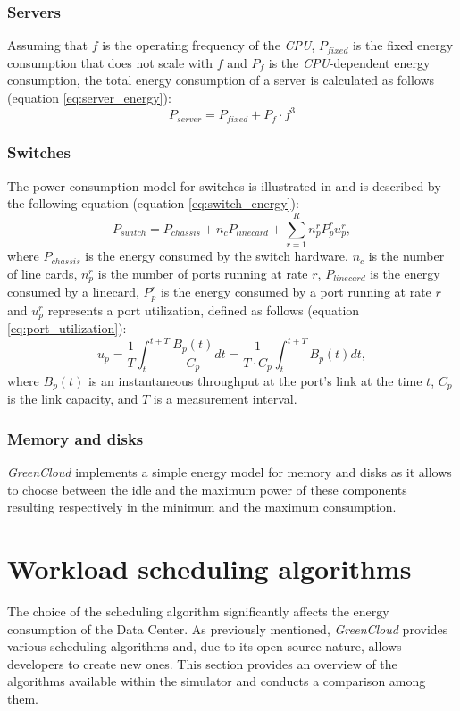 \subsubsection{Servers}
Assuming that \(f\) is the operating frequency of the \emph{CPU}, \(P_{fixed}\) is the fixed energy consumption that does not scale with \(f\) and \(P_f\) is the \emph{CPU}-dependent energy consumption, the total energy consumption of a server is calculated as follows (equation \ref{eq:server_energy}):
\begin{equation} \label{eq:server_energy}
    P_{server} = P_{fixed} + P_f \cdot f^3
\end{equation}
\subsubsection{Switches}
The power consumption model for switches is illustrated in \cite{makaratzis2018energy} and is described by the following equation (equation \ref{eq:switch_energy}):
\begin{equation} \label{eq:switch_energy}
    P_{switch} = P_{chassis} + n_cP_{linecard} + \sum_{r=1}^{R} n^r_pP^r_pu^r_p,
\end{equation}
where \(P_{chassis}\) is the energy consumed by the switch hardware, \(n_c\) is the number of line cards, \(n_p^r\) is the number of ports running at rate \(r\),  \(P_{linecard}\) is the energy consumed by a linecard, \(P_p^r\) is the energy consumed by a port running at rate \(r\) and \(u_p^r\) represents a port utilization, defined as follows (equation \ref{eq:port_utilization}):
\begin{equation} \label{eq:port_utilization}
    u_p = \frac{1}{T} \int_{t}^{t+T} \frac{B_p(t)}{C_p} dt = \frac{1}{T\cdot C_p} \int_{t}^{t+T} B_p(t) dt,
\end{equation}
where \(B_p(t)\) is an instantaneous throughput at the port's link at the time \(t\), \(C_p\) is the link capacity, and \(T\) is a measurement interval. 
\subsubsection{Memory and disks}
\emph{GreenCloud} implements a simple energy model for memory and disks as it allows to choose between the idle and the maximum power of these components resulting respectively in the minimum and the maximum consumption. 

\section{Workload scheduling algorithms} 
The choice of the scheduling algorithm significantly affects the energy consumption of the Data Center. As previously mentioned, \emph{GreenCloud} provides various scheduling algorithms and, due to its open-source nature, allows developers to create new ones. This section provides an overview of the algorithms available within the simulator and conducts a comparison among them.
